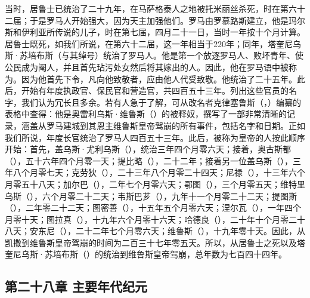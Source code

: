 当时，居鲁士已统治了二十九年，在马萨格泰人之地被托米丽丝杀死，时在第六十二届；于是罗马人开始强大，因为天主加强他们。罗马由罗慕路斯建立，他是玛尔斯和伊利亚所传说的儿子，时在第七届，四月二十一日，当时一年按十个月计算。居鲁士既死，如我们所说，在第六十二届，这一年相当于220年；同年，塔奎尼乌斯·苏培布斯（与其绰号）统治了罗马人。他是第一个放逐罗马人、败坏青年、使公民成为阉人，并且首先玷污处女然后将其嫁出的人。因此，他在罗马语中被称为。因为他首先下令，凡向他致敬者，应由他人代受致敬。他统治了二十五年。此后，开始有年度执政官、保民官和营造官，共四百五十三年。列出这些官员的名字，我们认为冗长且多余。若有人急于了解，可从改名者克律塞鲁斯（，）编纂的表格中查得：他是奥雷利乌斯·维鲁斯（）的被释奴，撰写了一部非常清晰的记录，涵盖从罗马建城到其恩主维鲁斯皇帝驾崩的所有事件，包括名字和日期。正如我们所说，年度长官统治了罗马人四百五十三年。此后，被称为皇帝的人按此顺序开始：首先，盖乌斯·尤利乌斯（），统治三年四个月零六天；接着，奥古斯都（），五十六年四个月零一天；提比略（），二十二年；接着另一位盖乌斯（），三年八个月零七天；克劳狄（），二十三年八个月零二十四天；尼禄（），十三年六个月零五十八天；加尔巴（），二年七个月零六天；鄂图（），三个月零五天；维特里乌斯（），六个月零二十二天；韦斯巴芗（），九年十一个月零二十二天；提图斯（），二年零二十二天；图密善（），十五年五个月零六天；涅尔瓦（），一年四个月零十天；图拉真（），十九年六个月零十六天；哈德良（），二十年十个月零二十八天；安东尼（），二十二年七个月零六天；维鲁斯（），十九年零十天。因此，从凯撒到维鲁斯皇帝驾崩的时间为二百三十七年零五天。所以，从居鲁士之死以及塔奎尼乌斯·苏培布斯（）的统治到维鲁斯皇帝驾崩，总年数为七百四十四年。\par


\subsection{第二十八章 主要年代纪元}

